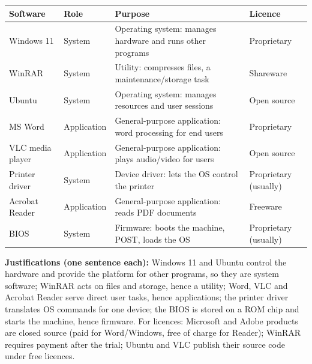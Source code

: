 \documentclass[11pt]{article}
\begin{document}
\begin{corrige}
\begin{center}
\begin{tabularx}{\linewidth}{|l|l|X|l|}
\hline
\rowcolor{popblueL} \textbf{Software} & \textbf{Role} & \textbf{Purpose} & \textbf{Licence} \\
\hline
Windows 11 & System & Operating system: manages hardware and runs other programs & Proprietary \\
\hline
WinRAR & System & Utility: compresses files, a maintenance/storage task & Shareware \\
\hline
Ubuntu & System & Operating system: manages resources and user sessions & Open source \\
\hline
MS Word & Application & General-purpose application: word processing for end users & Proprietary \\
\hline
VLC media player & Application & General-purpose application: plays audio/video for users & Open source \\
\hline
Printer driver & System & Device driver: lets the OS control the printer & Proprietary (usually) \\
\hline
Acrobat Reader & Application & General-purpose application: reads PDF documents & Freeware \\
\hline
BIOS & System & Firmware: boots the machine, POST, loads the OS & Proprietary (usually) \\
\hline
\end{tabularx}
\end{center}
\textbf{Justifications (one sentence each):} Windows 11 and Ubuntu control the hardware and provide the platform for other programs, so they are system software; WinRAR acts on files and storage, hence a utility; Word, VLC and Acrobat Reader serve direct user tasks, hence applications; the printer driver translates OS commands for one device; the BIOS is stored on a ROM chip and starts the machine, hence firmware. For licences: Microsoft and Adobe products are closed source (paid for Word/Windows, free of charge for Reader); WinRAR requires payment after the trial; Ubuntu and VLC publish their source code under free licences.
\end{corrige}
\end{document}
